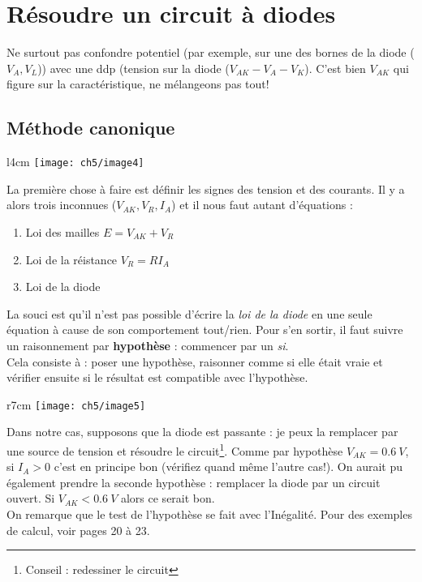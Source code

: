 		
	\section{Résoudre un circuit à diodes}
	\danger Ne surtout pas confondre potentiel (par exemple, sur une des bornes de 
	la diode ($V_A, V_L$)) avec une ddp (tension sur la diode ($V_{AK}-V_A-V_K$). 
	C'est bien $V_{AK}$ qui figure sur la caractéristique, ne mélangeons pas tout!
	
		\subsection{Méthode canonique}
			\begin{wrapfigure}[7]{l}{4cm}
	\vspace{-0.5cm}
	\texttt{[image: ch5/image4]}
	\end{wrapfigure}
		La première chose à faire est définir les signes des tension et des courants. 
		Il y a alors trois inconnues ($V_{AK}, V_R, I_A$) et il nous faut autant 
		d'équations :
		\begin{enumerate}
		\item Loi des mailles $E = V_{AK}+V_R$
		\item Loi de la réistance $V_R=RI_A$
		\item Loi de la diode
		\end{enumerate}
		La souci est qu'il n'est pas possible d'écrire la \textit{loi de la diode} 
		en une seule équation à cause de son comportement tout/rien. Pour s'en 
		sortir, il faut suivre un raisonnement par \textbf{hypothèse} : commencer 
		par un \textit{si}.\\
		Cela consiste à : poser une hypothèse, raisonner comme si elle était vraie 
		et vérifier ensuite si le résultat est compatible avec l'hypothèse.
		
		\newpage
		\begin{wrapfigure}[10]{r}{7cm}
	\texttt{[image: ch5/image5]}
	\end{wrapfigure}
		Dans notre cas, supposons que la diode est passante : je peux la remplacer 
		par une source de tension et résoudre le circuit\footnote{Conseil : redessiner 
		le circuit}. Comme par hypothèse $V_{AK}=0.6\ V$, si $I_A>0$ c'est en principe 
		bon (vérifiez quand même l'autre cas!). On aurait pu également prendre la 
		seconde hypothèse : remplacer la diode par un circuit ouvert. Si $V_{AK}<0.6\ V$
		alors ce serait bon.\\
		On remarque que le test de l'hypothèse se fait avec l’Inégalité. Pour des 
		exemples de calcul, voir pages 20 à 23.\\
		
